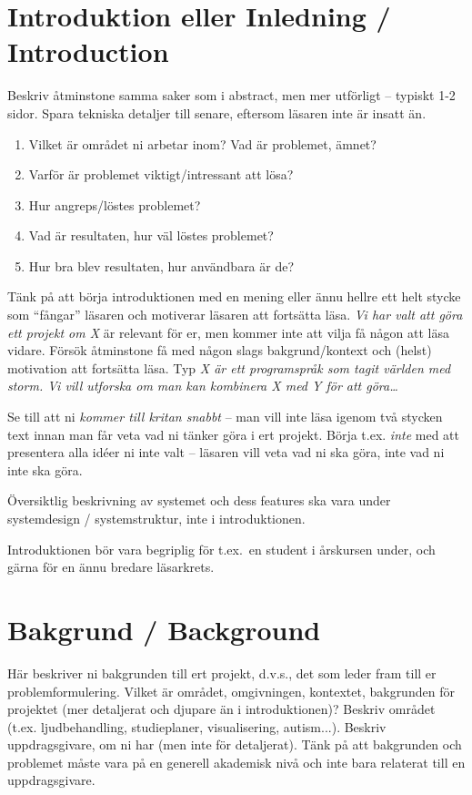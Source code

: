\documentclass[a4paper,12pt]{article}
\begin{document}
\section{Introduktion eller Inledning / Introduction}
Beskriv åtminstone samma saker som i abstract, men mer utförligt -- typiskt 1-2 sidor. Spara tekniska detaljer till senare, eftersom läsaren inte är insatt än.

\begin{enumerate}
\item Vilket är området ni arbetar inom? Vad är problemet, ämnet? 
\item Varför är problemet viktigt/intressant att lösa?
\item Hur angreps/löstes problemet? 
\item Vad är resultaten, hur väl löstes problemet?
\item Hur bra blev resultaten, hur användbara är de?
\end{enumerate}

Tänk på att börja introduktionen med en mening eller ännu hellre ett helt stycke som ``fångar'' läsaren och motiverar läsaren att fortsätta läsa.  \emph{Vi har valt att göra ett projekt om X} är relevant för er, men kommer inte att vilja få någon att läsa vidare.  Försök åtminstone få med någon slags bakgrund/kontext och (helst) motivation att fortsätta läsa.  Typ \emph{X är ett programspråk som tagit världen med storm.  Vi vill utforska om man kan kombinera X med Y för att göra\ldots}

Se till att ni \emph{kommer till kritan snabbt} – man vill inte läsa igenom två stycken text innan man får veta vad ni tänker göra i ert projekt.  Börja t.ex. \emph{inte} med att presentera alla idéer ni inte valt – läsaren vill veta vad ni ska göra, inte vad ni inte ska göra.

Översiktlig beskrivning av systemet och dess features ska vara under systemdesign / systemstruktur, inte i introduktionen.

Introduktionen bör vara begriplig för t.ex.~en student i årskursen under, och gärna för en ännu bredare läsarkrets.

\section{Bakgrund / Background}
Här beskriver ni bakgrunden till ert projekt, d.v.s., det som leder fram till er problemformulering.  Vilket är området, omgivningen, kontextet, bakgrunden för projektet (mer detaljerat och djupare än i introduktionen)?  Beskriv området (t.ex. ljudbehandling, studieplaner, visualisering, autism...).  Beskriv uppdragsgivare, om ni har (men inte för detaljerat).  Tänk på att bakgrunden och problemet måste vara på en generell akademisk nivå och inte bara relaterat till en uppdragsgivare.
\end{document}
